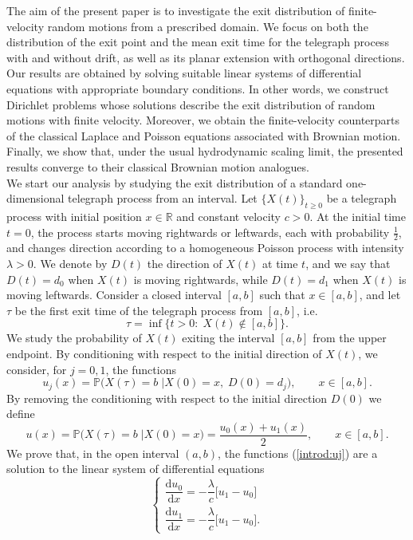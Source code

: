 \documentclass{article}
\begin{document}
The aim of the present paper is to investigate the exit distribution of finite-velocity random motions from a prescribed domain. We focus on both the distribution of the exit point and the mean exit time for the telegraph process with and without drift, as well as its planar extension with orthogonal directions. Our results are obtained by solving suitable linear systems of differential equations with appropriate boundary conditions. In other words, we construct Dirichlet problems whose solutions describe the exit distribution of random motions with finite velocity. Moreover, we obtain the finite-velocity counterparts of the classical Laplace and Poisson equations associated with Brownian motion. Finally, we show that, under the usual hydrodynamic scaling limit, the presented results converge to their classical Brownian motion analogues.\\
We start our analysis by studying the exit distribution of a standard one-dimensional telegraph process from an interval. Let $\{X(t)\}_{t\ge0}$ be a telegraph process with initial position $x\in\mathbb{R}$ and constant velocity $c>0$. At the initial time $t=0$, the process starts moving rightwards or leftwards, each with probability $\frac{1}{2}$, and changes direction according to a homogeneous Poisson process with intensity $\lambda>0$. We denote by $D(t)$ the direction of $X(t)$ at time $t$, and we say that $D(t)=d_0$ when $X(t)$ is moving rightwards, while $D(t)=d_1$ when $X(t)$ is moving leftwards. Consider a closed interval $[a,b]$ such that $x\in[a,b]$, and let $\tau$ be the first exit time of the telegraph process from $[a,b]$, i.e.
$$\tau=\inf\{t>0:\;X(t)\notin[a,b]\}.$$
We study the probability of $X(t)$ exiting the interval $[a,b]$ from the upper endpoint. By conditioning with respect to the initial direction of $X(t)$, we consider, for $j=0,1$, the functions
\begin{equation}u_j(x)=\mathbb{P}\Big(X(\tau)=b\;\Big\lvert X(0)=x,\; D(0)=d_j\Big),\qquad x\in[a,b].\label{introd:uj}\end{equation}
By removing the conditioning with respect to the initial direction $D(0)$ we define
\begin{equation*}u(x)=\mathbb{P}\Big(X(\tau)=b\;\Big\lvert X(0)=x\Big)=\frac{u_0(x)+u_1(x)}{2},\qquad x\in[a,b].\end{equation*}%
We prove that, in the open interval $(a,b)$, the functions (\ref{introd:uj}) are a solution to the linear system of differential equations
\begin{equation}\label{introd:ujdsys}
\begin{cases}
\dfrac{\mathrm{d} u_0}{\mathrm{d}x}=-\dfrac{\lambda}{c}\big[u_1-u_0\big]\\[0.75em]
\dfrac{\mathrm{d} u_1}{\mathrm{d}x}=-\dfrac{\lambda}{c}\big[u_1-u_0\big].
\end{cases}
\end{equation}
\end{document}
